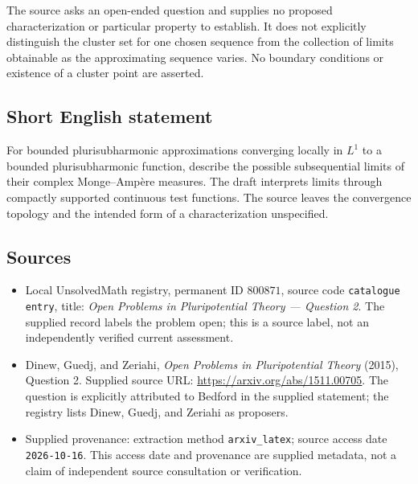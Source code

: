\documentclass[11pt]{article}
\begin{document}
The source asks an open-ended question and supplies no proposed characterization or particular property to establish. It does not explicitly distinguish the cluster set for one chosen sequence from the collection of limits obtainable as the approximating sequence varies. No boundary conditions or existence of a cluster point are asserted.
\subsection{Short English statement}
For bounded plurisubharmonic approximations converging locally in \(L^1\) to a bounded plurisubharmonic function, describe the possible subsequential limits of their complex Monge--Amp\`ere measures. The draft interprets limits through compactly supported continuous test functions. The source leaves the convergence topology and the intended form of a characterization unspecified.
\subsection{Sources}
\begin{itemize}
\item Local UnsolvedMath registry, permanent ID \(800871\), source code \texttt{catalogue entry}, title: \emph{Open Problems in Pluripotential Theory --- Question 2}. The supplied record labels the problem open; this is a source label, not an independently verified current assessment.
\item Dinew, Guedj, and Zeriahi, \emph{Open Problems in Pluripotential Theory} (2015), Question 2. Supplied source URL: \url{https://arxiv.org/abs/1511.00705}. The question is explicitly attributed to Bedford in the supplied statement; the registry lists Dinew, Guedj, and Zeriahi as proposers.
\item Supplied provenance: extraction method \texttt{arxiv\_latex}; source access date \texttt{2026-10-16}. This access date and provenance are supplied metadata, not a claim of independent source consultation or verification.
\end{itemize}
\end{document}
